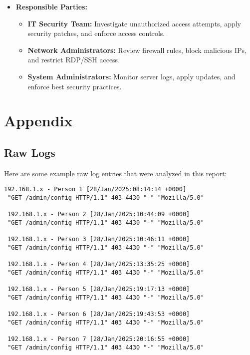 \documentclass[11pt]{article}
\begin{document}
\begin{itemize}
    \item \textbf{Responsible Parties:}
    \begin{itemize}
        \item \textbf{IT Security Team:} Investigate unauthorized access attempts, apply security patches, and enforce access controls.
        \item \textbf{Network Administrators:} Review firewall rules, block malicious IPs, and restrict RDP/SSH access.
        \item \textbf{System Administrators:} Monitor server logs, apply updates, and enforce best security practices.
    \end{itemize}
\end{itemize}


\appendix
\section{Appendix}
\label{sec:appendix}

\subsection{Raw Logs}
\label{sec:raw_logs}
Here are some example raw log entries that were analyzed in this report:

\begin{verbatim}
192.168.1.x - Person 1 [28/Jan/2025:08:14:14 +0000]
 "GET /admin/config HTTP/1.1" 403 4430 "-" "Mozilla/5.0"

 192.168.1.x - Person 2 [28/Jan/2025:10:44:09 +0000]
 "GET /admin/config HTTP/1.1" 403 4430 "-" "Mozilla/5.0"

 192.168.1.x - Person 3 [28/Jan/2025:10:46:11 +0000]
 "GET /admin/config HTTP/1.1" 403 4430 "-" "Mozilla/5.0"

 192.168.1.x - Person 4 [28/Jan/2025:13:35:25 +0000]
 "GET /admin/config HTTP/1.1" 403 4430 "-" "Mozilla/5.0"

 192.168.1.x - Person 5 [28/Jan/2025:19:17:13 +0000]
 "GET /admin/config HTTP/1.1" 403 4430 "-" "Mozilla/5.0"

 192.168.1.x - Person 6 [28/Jan/2025:19:43:53 +0000]
 "GET /admin/config HTTP/1.1" 403 4430 "-" "Mozilla/5.0"

 192.168.1.x - Person 7 [28/Jan/2025:20:16:55 +0000]
 "GET /admin/config HTTP/1.1" 403 4430 "-" "Mozilla/5.0"

\end{verbatim}
\end{document}
